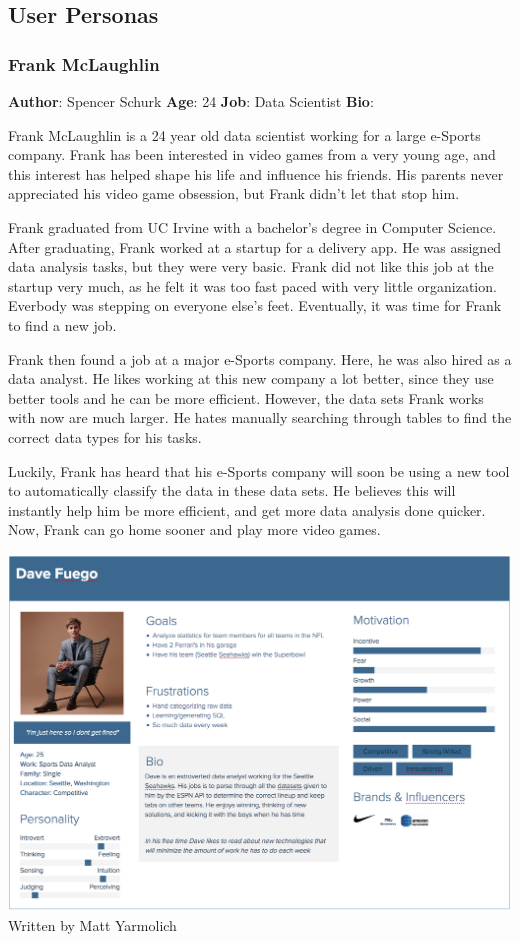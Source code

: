 \documentclass[12pt,oneside,letterpaper]{article}
\begin{document}
\subsection{User Personas}
\subsubsection{Frank McLaughlin}
\textbf{Author}: Spencer Schurk\newline
\textbf{Age}: 24\newline
\textbf{Job}: Data Scientist\newline
\textbf{Bio}:\newline
\par Frank McLaughlin is a 24 year old data scientist working for a large e-Sports company. Frank has been interested in video games from a very young age, and this interest has helped shape his life and influence his friends. His parents never appreciated his video game obsession, but Frank didn't let that stop him.
\par Frank graduated from UC Irvine with a bachelor's degree in Computer Science. After graduating, Frank worked at a startup for a delivery app. He was assigned data analysis tasks, but they were very basic. Frank did not like this job at the startup very much, as he felt it was too fast paced with very little organization. Everbody was stepping on everyone else's feet. Eventually, it was time for Frank to find a new job.
\par Frank then found a job at a major e-Sports company. Here, he was also hired as a data analyst. He likes working at this new company a lot better, since they use better tools and he can be more efficient. However, the data sets Frank works with now are much larger. He hates manually searching through tables to find the correct data types for his tasks.
\par Luckily, Frank has heard that his e-Sports company will soon be using a new tool to automatically classify the data in these data sets. He believes this will instantly help him be more efficient, and get more data analysis done quicker. Now, Frank can go home sooner and play more video games.\newline

\includegraphics[width = \textwidth]{Dave-MattYarmolich-UserStory.png}
Written by Matt Yarmolich
\end{document}

